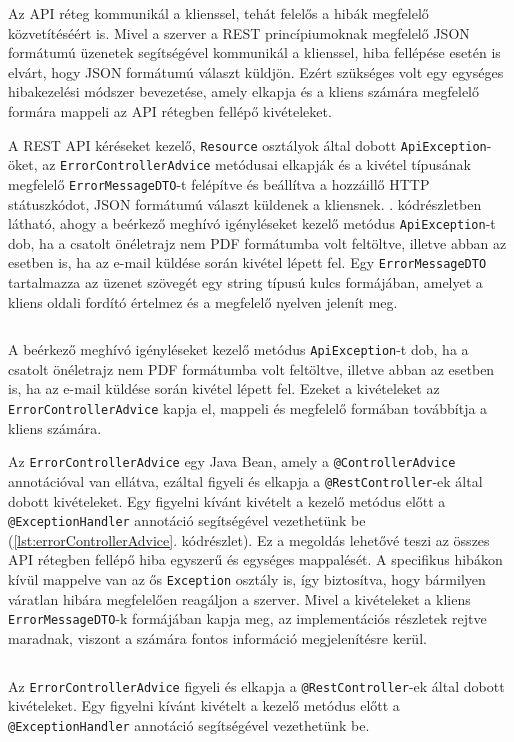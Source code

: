 Az API réteg kommunikál a klienssel, tehát felelős a hibák megfelelő közvetítéséért is. Mivel a szerver a REST princípiumoknak megfelelő JSON formátumú üzenetek segítségével kommunikál a klienssel, hiba fellépése esetén is elvárt, hogy JSON formátumú választ küldjön. Ezért szükséges volt egy egységes hibakezelési módszer bevezetése, amely elkapja és a kliens számára megfelelő formára mappeli az API rétegben fellépő kivételeket.

A REST API kéréseket kezelő, \texttt{Resource} osztályok által dobott \texttt{ApiException}-öket, az \texttt{ErrorControllerAdvice} metódusai elkapják és a kivétel típusának megfelelő \texttt{ErrorMessageDTO}-t felépítve és beállítva a hozzáillő HTTP státuszkódot, JSON formátumú választ küldenek a kliensnek. . kódrészletben látható, ahogy a beérkező meghívó igényléseket kezelő metódus \texttt{ApiException}-t dob, ha a csatolt önéletrajz nem PDF formátumba volt feltöltve, illetve abban az esetben is, ha az e-mail küldése során kivétel lépett fel. Egy \texttt{ErrorMessageDTO} tartalmazza az üzenet szövegét egy string típusú kulcs formájában, amelyet a kliens oldali fordító értelmez és a megfelelő nyelven jelenít meg.
\begin{listing}
  \inputminted[fontsize=\small]{java}{progfiles/ApiException.java}
  \caption{A beérkező meghívó igényléseket kezelő metódus \texttt{ApiException}-t dob, ha a csatolt önéletrajz nem PDF formátumba volt feltöltve, illetve abban az esetben is, ha az e-mail küldése során kivétel lépett fel. Ezeket a kivételeket az \texttt{ErrorControllerAdvice} kapja el, mappeli és megfelelő formában továbbítja a kliens számára. }
  \label{lst:apiException}
\end{listing}

Az \texttt{ErrorControllerAdvice} egy Java Bean, amely a \texttt{@ControllerAdvice} annotációval van ellátva, ezáltal figyeli és elkapja a \texttt{@RestController}-ek által dobott kivételeket. Egy figyelni kívánt kivételt a kezelő metódus előtt a  \texttt{@ExceptionHandler} annotáció segítségével vezethetünk be (\ref{lst:errorControllerAdvice}. kódrészlet). Ez a megoldás lehetővé teszi az összes API rétegben fellépő hiba egyszerű és egységes mappalését. A specifikus hibákon kívül mappelve van az ős \texttt{Exception} osztály is, így biztosítva, hogy bármilyen váratlan hibára megfelelően reagáljon a szerver. Mivel a kivételeket a kliens \texttt{ErrorMessageDTO}-k formájában kapja meg, az implementációs részletek rejtve maradnak, viszont a számára fontos információ megjelenítésre kerül.  
\begin{listing}
  \inputminted[fontsize=\small]{java}{progfiles/ErrorControllerAdvice.java}
  \caption{Az \texttt{ErrorControllerAdvice} figyeli és elkapja a \texttt{@RestController}-ek által dobott kivételeket. Egy figyelni kívánt kivételt a kezelő metódus előtt a  \texttt{@ExceptionHandler} annotáció segítségével vezethetünk be. }
  \label{lst:errorControllerAdvice}
\end{listing}

